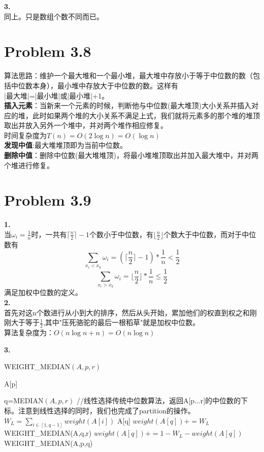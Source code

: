 \documentclass[twocolumn]{ctexart}
\begin{document}
\noindent \textbf{3.}\\
同上。只是数组个数不同而已。

\section*{Problem 3.8}
算法思路：维护一个最大堆和一个最小堆，最大堆中存放小于等于中位数的数（包括中位数本身），最小堆中存放大于中位数的数。这样有\\
\indent |最大堆|=|最小堆|或|最小堆|+1。\\
\textbf{插入元素}：当新来一个元素的时候，判断他与中位数(最大堆顶)大小关系并插入对应的堆，此时如果两个堆的大小关系不满足上式，我们就将元素多的那个堆的堆顶取出并放入另外一个堆中，并对两个堆作相应修复。\\
\indent 时间复杂度为$T(n)=O(2\log{n})=O(\log{n})$\\
\textbf{发现中值}:最大堆堆顶即为当前中位数。\\
\textbf{删除中值}：删除中位数(最大堆堆顶)，将最小堆堆顶取出并加入最大堆中，并对两个堆进行修复。\\


\section*{Problem 3.9}
\noindent \textbf{1.}\\
\indent 当$\omega_i=\frac{1}{n}$时，一共有$\lceil\frac{n}{2}\rceil-1$个数小于中位数，有$\lfloor\frac{n}{2}\rfloor$个数大于中位数，而对于中位数有
\[
	\sum_{x_i<x_k}\omega_i=(\lceil\frac{n}{2}\rceil-1)*\frac{1}{n}<\frac{1}{2}\]
\[
	\sum_{x_i>x_k}\omega_i=\lfloor\frac{n}{2}\rfloor*\frac{1}{n}\le\frac{1}{2}
\]
满足加权中位数的定义。\\


\noindent \textbf{2.}\\
\indent 首先对这n个数进行从小到大的排序，然后从头开始，累加他们的权直到权之和刚刚大于等于$\frac{1}{2}$,其中"压死骆驼的最后一根稻草"就是加权中位数。\\

\indent 算法复杂度为：$O(n\log{n}+n)=O(n\log{n})$

\noindent \textbf{3.}\\
\begin{algorithm}
	\caption{WEIGHT\_MEDIAN$(A,p,r)$}
	\label{weight_median}
	\begin{algorithmic}[1]
			\RETURN A[p]
		\ENDIF
		
		\STATE q=MEDIAN$(A,p,r)$
		\STATE //线性选择传统中位数算法，返回A[p...r]的中位数的下标。注意到线性选择的同时，我们也完成了partition的操作。
		\STATE $W_L=\sum_{i\in[1,q-1]}weight(A[i])$
			\RETURN A[q]
			\STATE $weight(A[q])+=W_L$
			\RETURN WEIGHT\_MEDIAN(A,q,r)
		\ELSE
			\STATE $weight(A[q])+=1-W_L-weight(A[q])$
			\RETURN WEIGHT\_MEDIAN(A,p,q)
		\ENDIF	
		
	\end{algorithmic}
\end{algorithm}
\end{document}
